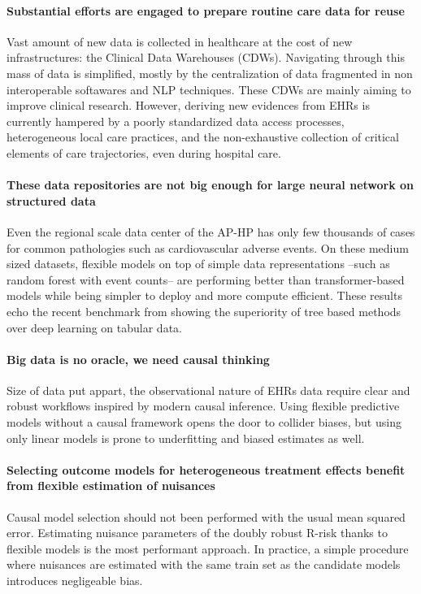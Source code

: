 \documentclass[french,12pt,twoside,a4paper]{book}
\begin{document}
\paragraph{Substantial efforts are engaged to prepare routine care data for reuse}
Vast amount of new data is collected in healthcare at the cost of new
infrastructures: the Clinical Data Warehouses (CDWs). Navigating through this
mass of data is simplified, mostly by the centralization of data fragmented in
non interoperable softawares and NLP techniques. These CDWs are mainly aiming to
improve clinical research. However, deriving new evidences from EHRs is
currently hampered  by a poorly standardized data access processes,
heterogeneous local care practices, and the non-exhaustive collection of
critical elements of care trajectories, even during hospital care.
%
\paragraph{These data repositories are not big enough for large neural network
  on structured data} Even the regional scale data center of the AP-HP has only
few thousands of cases for common pathologies such as cardiovascular adverse
events. On these medium sized datasets, flexible models on top of simple data
representations --such as random forest with event counts-- are performing
better than transformer-based models while being simpler to deploy and more
compute efficient. These results echo the recent benchmark from
\cite{grinsztajn2022tree} showing the superiority of tree based methods over
deep learning on tabular data.
%
\paragraph{Big data is no oracle, we need causal thinking} Size of data put
appart, the observational nature of EHRs data require clear and robust workflows
inspired by modern causal inference. Using flexible predictive models without a
causal framework opens the door to collider biases, but using only linear models
is prone to underfitting and biased estimates as well.

%
\paragraph{Selecting outcome models for heterogeneous treatment effects benefit
  from flexible estimation of nuisances} Causal model selection should not been
performed with the usual mean squared error. Estimating nuisance parameters of
the doubly robust R-risk thanks to flexible models is the most performant
approach. In practice, a simple procedure where nuisances are estimated with
the same train set as the candidate models introduces negligeable bias.
\end{document}
